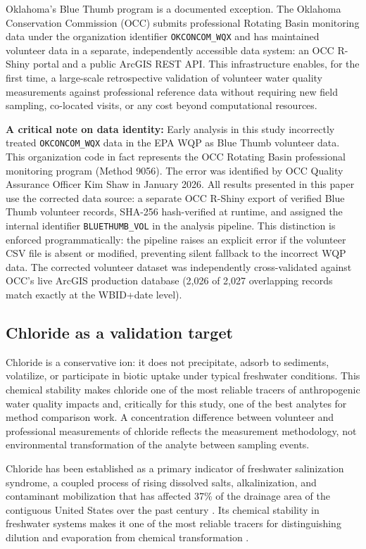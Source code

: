 \documentclass[lineno]{wlpeerj}
\begin{document}
Oklahoma's Blue Thumb program is a documented exception. The Oklahoma Conservation Commission (OCC) submits professional Rotating Basin monitoring data under the organization identifier \texttt{OKCONCOM\_WQX} and has maintained volunteer data in a separate, independently accessible data system: an OCC R-Shiny portal and a public ArcGIS REST API. This infrastructure enables, for the first time, a large-scale retrospective validation of volunteer water quality measurements against professional reference data without requiring new field sampling, co-located visits, or any cost beyond computational resources.

\textbf{A critical note on data identity:} Early analysis in this study incorrectly treated \texttt{OKCONCOM\_WQX} data in the EPA WQP as Blue Thumb volunteer data. This organization code in fact represents the OCC Rotating Basin professional monitoring program (Method 9056). The error was identified by OCC Quality Assurance Officer Kim Shaw in January 2026. All results presented in this paper use the corrected data source: a separate OCC R-Shiny export of verified Blue Thumb volunteer records, SHA-256 hash-verified at runtime, and assigned the internal identifier \texttt{BLUETHUMB\_VOL} in the analysis pipeline. This distinction is enforced programmatically: the pipeline raises an explicit error if the volunteer CSV file is absent or modified, preventing silent fallback to the incorrect WQP data. The corrected volunteer dataset was independently cross-validated against OCC's live ArcGIS production database (2,026 of 2,027 overlapping records match exactly at the WBID+date level).

\subsection{Chloride as a validation target}

Chloride is a conservative ion: it does not precipitate, adsorb to sediments, volatilize, or participate in biotic uptake under typical freshwater conditions. This chemical stability makes chloride one of the most reliable tracers of anthropogenic water quality impacts and, critically for this study, one of the best analytes for method comparison work. A concentration difference between volunteer and professional measurements of chloride reflects the measurement methodology, not environmental transformation of the analyte between sampling events.

Chloride has been established as a primary indicator of freshwater salinization syndrome, a coupled process of rising dissolved salts, alkalinization, and contaminant mobilization that has affected 37\% of the drainage area of the contiguous United States over the past century \citep{Kaushal2018}. Its chemical stability in freshwater systems makes it one of the most reliable tracers for distinguishing dilution and evaporation from chemical transformation \citep{Hem1985}.
\end{document}
